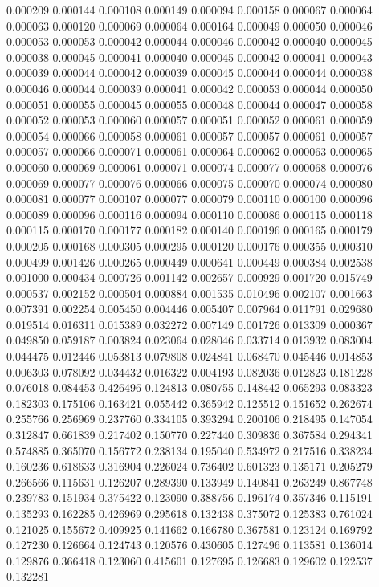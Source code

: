 0.000209
0.000144
0.000108
0.000149
0.000094
0.000158
0.000067
0.000064
0.000063
0.000120
0.000069
0.000064
0.000164
0.000049
0.000050
0.000046
0.000053
0.000053
0.000042
0.000044
0.000046
0.000042
0.000040
0.000045
0.000038
0.000045
0.000041
0.000040
0.000045
0.000042
0.000041
0.000043
0.000039
0.000044
0.000042
0.000039
0.000045
0.000044
0.000044
0.000038
0.000046
0.000044
0.000039
0.000041
0.000042
0.000053
0.000044
0.000050
0.000051
0.000055
0.000045
0.000055
0.000048
0.000044
0.000047
0.000058
0.000052
0.000053
0.000060
0.000057
0.000051
0.000052
0.000061
0.000059
0.000054
0.000066
0.000058
0.000061
0.000057
0.000057
0.000061
0.000057
0.000057
0.000066
0.000071
0.000061
0.000064
0.000062
0.000063
0.000065
0.000060
0.000069
0.000061
0.000071
0.000074
0.000077
0.000068
0.000076
0.000069
0.000077
0.000076
0.000066
0.000075
0.000070
0.000074
0.000080
0.000081
0.000077
0.000107
0.000077
0.000079
0.000110
0.000100
0.000096
0.000089
0.000096
0.000116
0.000094
0.000110
0.000086
0.000115
0.000118
0.000115
0.000170
0.000177
0.000182
0.000140
0.000196
0.000165
0.000179
0.000205
0.000168
0.000305
0.000295
0.000120
0.000176
0.000355
0.000310
0.000499
0.001426
0.000265
0.000449
0.000641
0.000449
0.000384
0.002538
0.001000
0.000434
0.000726
0.001142
0.002657
0.000929
0.001720
0.015749
0.000537
0.002152
0.000504
0.000884
0.001535
0.010496
0.002107
0.001663
0.007391
0.002254
0.005450
0.004446
0.005407
0.007964
0.011791
0.029680
0.019514
0.016311
0.015389
0.032272
0.007149
0.001726
0.013309
0.000367
0.049850
0.059187
0.003824
0.023064
0.028046
0.033714
0.013932
0.083004
0.044475
0.012446
0.053813
0.079808
0.024841
0.068470
0.045446
0.014853
0.006303
0.078092
0.034432
0.016322
0.004193
0.082036
0.012823
0.181228
0.076018
0.084453
0.426496
0.124813
0.080755
0.148442
0.065293
0.083323
0.182303
0.175106
0.163421
0.055442
0.365942
0.125512
0.151652
0.262674
0.255766
0.256969
0.237760
0.334105
0.393294
0.200106
0.218495
0.147054
0.312847
0.661839
0.217402
0.150770
0.227440
0.309836
0.367584
0.294341
0.574885
0.365070
0.156772
0.238134
0.195040
0.534972
0.217516
0.338234
0.160236
0.618633
0.316904
0.226024
0.736402
0.601323
0.135171
0.205279
0.266566
0.115631
0.126207
0.289390
0.133949
0.140841
0.263249
0.867748
0.239783
0.151934
0.375422
0.123090
0.388756
0.196174
0.357346
0.115191
0.135293
0.162285
0.426969
0.295618
0.132438
0.375072
0.125383
0.761024
0.121025
0.155672
0.409925
0.141662
0.166780
0.367581
0.123124
0.169792
0.127230
0.126664
0.124743
0.120576
0.430605
0.127496
0.113581
0.136014
0.129876
0.366418
0.123060
0.415601
0.127695
0.126683
0.129602
0.122537
0.132281
